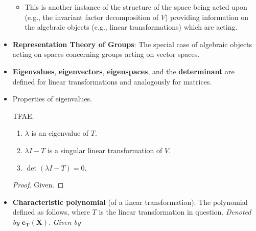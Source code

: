 \documentclass[../notes.tex]{subfiles}
\begin{document}
\begin{itemize}
\begin{itemize}
        \item This is another instance of the structure of the space being acted upon (e.g., the invariant factor decomposition of $V$) providing information on the algebraic objects (e.g., linear transformations) which are acting.
    \end{itemize}
    \item \textbf{Representation Theory of Groups}: The special case of algebraic objects acting on spaces concerning groups acting on vector spaces.
    \item \textbf{Eigenvalues}, \textbf{eigenvectors}, \textbf{eigenspaces}, and the \textbf{determinant} are defined for linear transformations and analogously for matrices.
    \item Properties of eigenvalues.
    \begin{proposition}\label{prp:12.12}
        TFAE.
        \begin{enumerate}
            \item $\lambda$ is an eigenvalue of $T$.
            \item $\lambda I-T$ is a singular linear transformation of $V$.
            \item $\det(\lambda I-T)=0$.
        \end{enumerate}
        \begin{proof}
            Given.
        \end{proof}
    \end{proposition}
    \item \textbf{Characteristic polynomial} (of a linear transformation): The polynomial defined as follows, where $T$ is the linear transformation in question. \emph{Denoted by} $\bm{c_T(X)}$. \emph{Given by}
    \begin{equation*}

\end{equation*}
\end{itemize}
\end{document}
